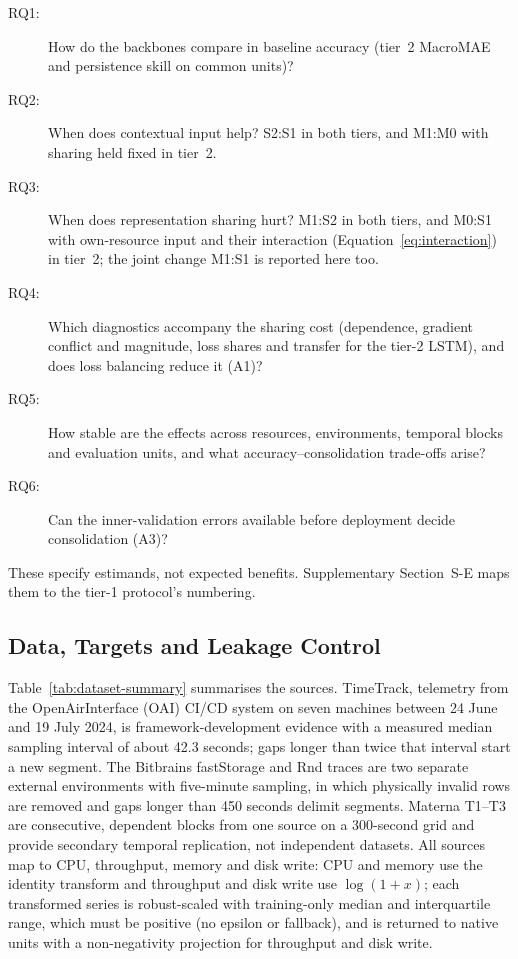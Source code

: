 \documentclass[5p,twocolumn]{elsarticle}
\begin{document}
\begin{description}
  \item[RQ1:] How do the backbones compare in baseline accuracy (tier~2
    MacroMAE and persistence skill on common units)?
  \item[RQ2:] When does contextual input help? S2:S1 in both tiers, and M1:M0
    with sharing held fixed in tier~2.
  \item[RQ3:] When does representation sharing hurt? M1:S2 in both tiers, and
    M0:S1 with own-resource input and their interaction
    (Equation~\ref{eq:interaction}) in tier~2; the joint change M1:S1 is
    reported here too.
  \item[RQ4:] Which diagnostics accompany the sharing cost (dependence,
    gradient conflict and magnitude, loss shares and transfer for the tier-2
    LSTM), and does loss balancing reduce it (A1)?
  \item[RQ5:] How stable are the effects across resources, environments,
    temporal blocks and evaluation units, and what accuracy--consolidation
    trade-offs arise?
  \item[RQ6:] Can the inner-validation errors available before deployment
    decide consolidation (A3)?
\end{description}

These specify estimands, not expected benefits. Supplementary Section~S-E
maps them to the tier-1 protocol's numbering.

\subsection{Data, Targets and Leakage Control}
\label{sec:datasets}
\label{sec:preprocessing}
\label{sec:leakage-control}
\label{sec:population-restrictions}
\label{sec:replication-design}

Table~\ref{tab:dataset-summary} summarises the sources. TimeTrack, telemetry
from the OpenAirInterface (OAI) CI/CD system on seven machines between
24 June and 19 July 2024, is framework-development evidence with a measured
median sampling interval of about 42.3 seconds; gaps longer than twice that
interval start a new segment. The Bitbrains fastStorage and Rnd traces are two separate
external environments with five-minute sampling, in which physically invalid
rows are removed and gaps longer than 450 seconds delimit segments. Materna
T1--T3 are consecutive, dependent blocks from one source on a 300-second grid
and provide secondary temporal replication, not independent datasets. All
sources map to CPU, throughput, memory and disk write: CPU and memory use the
identity transform and throughput and disk write use $\log(1+x)$; each
transformed series is robust-scaled with training-only median and
interquartile range, which must be positive (no epsilon or fallback), and is
returned to native units with a non-negativity projection for throughput and
disk write.
\end{document}
